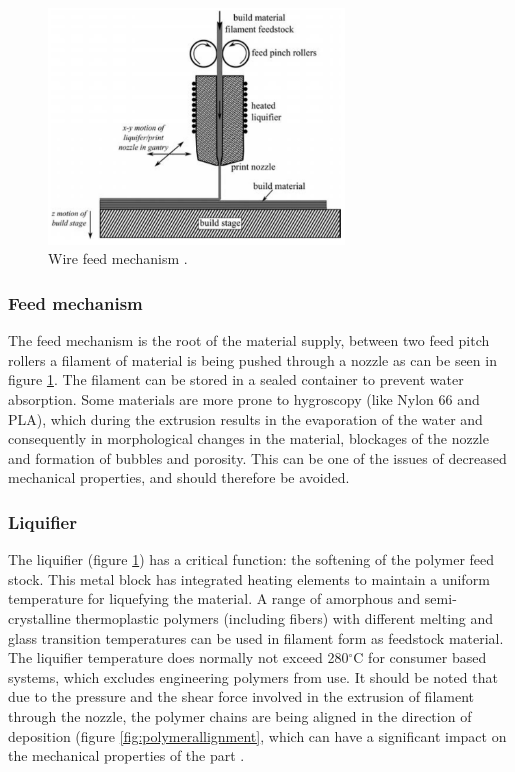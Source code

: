 \begin{figure}[H]
    \centering
    \includegraphics[width=0.70\textwidth]{chapter_2/figures/Wirefeedmechanism.PNG}
    \caption{Wire feed mechanism \cite{Turner2014AModeling}.}
    \label{fig:Wirefeed}
\end{figure}

\subsubsection{Feed mechanism}
    \label{Feed mechanism}
The feed mechanism is the root of the material supply, between two feed pitch rollers a filament of material is being pushed through a nozzle as can be seen in figure \ref{fig:Wirefeed}. The filament can be stored in a sealed container to prevent water absorption. Some materials are more prone to hygroscopy (like Nylon 66 and PLA), which during the extrusion results in the evaporation of the water and consequently in morphological changes in the material, blockages of the nozzle and formation of bubbles and porosity. This can be one of the issues of decreased mechanical properties, and should therefore be avoided. 

\subsubsection{Liquifier}
    \label{Liquifier}
The liquifier (figure \ref{fig:Wirefeed}) has a critical function: the softening of the polymer feed stock. This metal block has integrated heating elements to maintain a uniform temperature for liquefying the material.  A range of amorphous and semi-crystalline thermoplastic polymers (including fibers) with different melting and glass transition temperatures can be used in filament form as feedstock material. The liquifier temperature does normally not exceed 280$^{\circ}$C for consumer based systems, which excludes engineering polymers from use. It should be noted that due to the pressure and the shear force involved in the extrusion of filament through the nozzle, the polymer chains are being aligned in the direction of deposition (figure \ref{fig:polymerallignment}, which can have a significant impact on the mechanical properties of the part \cite{Mcilroy2017DisentanglementManufacturing}.


